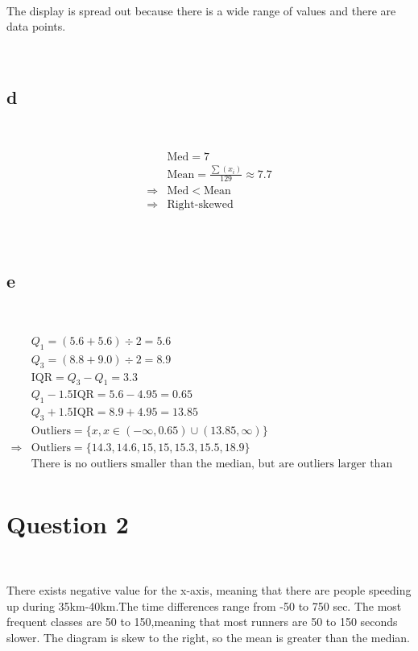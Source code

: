 \documentclass{article}
\begin{document}
~

The display is spread out because there is a wide range of values and there are data points.

~

\subsection*{d}

~

\begin{align*}
    &\mathrm{Med }=7\\
    &\mathrm{Mean }=\frac{\sum(x_i)}{129}\approx7.7\\
    \Rightarrow&\mathrm{Med}<\mathrm{Mean}\\
    \Rightarrow&\text{Right-skewed}\\
\end{align*}

~

\subsection*{e}

~

\begin{align*}
    &Q_1=(5.6+5.6)\div2=5.6\\
    &Q_3=(8.8+9.0)\div2=8.9\\
    &\mathrm{IQR}=Q_3-Q_1=3.3\\
    &Q_1-1.5\mathrm{IQR}=5.6-4.95=0.65\\
    &Q_3+1.5\mathrm{IQR}=8.9+4.95=13.85\\
    &\mathrm{Outliers}=\{x,x\in(-\infty,0.65)\cup(13.85,\infty)\}\\
    \Rightarrow&\mathrm{Outliers}=\{14.3,14.6,15,15,15.3,15.5,18.9\}\\
    &\text{There is no outliers smaller than the median, but are outliers larger than the median}\\
\end{align*}

\newpage

\section*{Question 2}

~

There exists negative value for the x-axis, meaning that there are people speeding up during 35km-40km.The time differences range from -50 to 750 sec. The most frequent classes are 50 to 150,meaning that most runners are 50 to 150 seconds slower. The diagram is skew to the right, so the mean is greater than the median.
\end{document}
